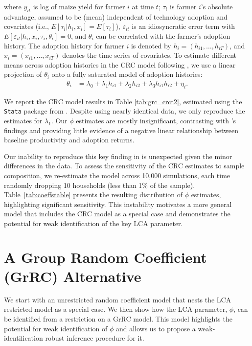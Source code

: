\documentclass[12pt]{article}
\theoremstyle{plain}
\theoremstyle{definition}
\begin{document}
\noindent where $y_{it}$ is log of maize yield for farmer $i$ at time $t$; $\tau_{i}$ is farmer $i$'s absolute advantage, assumed to be (mean) independent of technology adoption and covariates (i.e.,  $E[\tau_{i}|h_{i},x_i]=E[\tau_{i}]$), $\varepsilon_{it}$ is an idiosyncratic error term with $E[\varepsilon_{it}|h_i,x_i,\tau_i,\theta_i]=0$, and $\theta_i$ can be correlated with the farmer's adoption history. 
The adoption history for farmer $i$ is denoted by $h_{i}=(h_{i1},\dots,h_{iT})$, and $x_i=(x_{i1},\dots,x_{iT})$ denotes the time series of covariates. 
To estimate different means across adoption histories in the CRC model following \citet{C1984}, we use a linear projection of $\theta_i$ onto a fully saturated model of adoption histories:
\begin{align}
\theta_i&=\lambda_0+\lambda_1h_{i1}+\lambda_2h_{i2}+\lambda_3h_{i1}h_{i2}+\eta_i.\label{eq:thetai_projection}
\end{align}


We report the CRC model results in Table \ref{tab:grc_crct2}, estimated using the \texttt{Stata} package from \cite{BMMT2018}. 
Despite using nearly identical data, we only reproduce the estimates for $\lambda_1$. 
Our $\phi$ estimates are mostly insignificant, contrasting with \citet{S2011}'s findings and providing little evidence of a negative linear relationship between baseline productivity and adoption returns. 

Our inability to reproduce this key finding in \citet{S2011} is unexpected given the minor differences in the data. 
To assess the sensitivity of the CRC estimates to sample composition, we re-estimate the model across 10,000 simulations, each time randomly dropping 10 households (less than 1\% of the sample). 
Table~\ref{tab:coeffstable} presents the resulting distribution of $\phi$ estimates, highlighting significant sensitivity. 
This instability motivates a more general model that includes the \citet{S2011} CRC model as a special case and demonstrates the potential for weak identification of the key LCA parameter.


\section{A Group Random Coefficient (GrRC) Alternative}\label{sec:GrRC_model}

We start with an unrestricted random coefficient model that nests the LCA restricted model as a special case. 
We then show how the LCA parameter, $\phi$, can be identified from a restriction on a GrRC model. This model highlights the potential for weak identification of $\phi$ and allows us to propose a weak-identification robust inference procedure for it.
\end{document}
